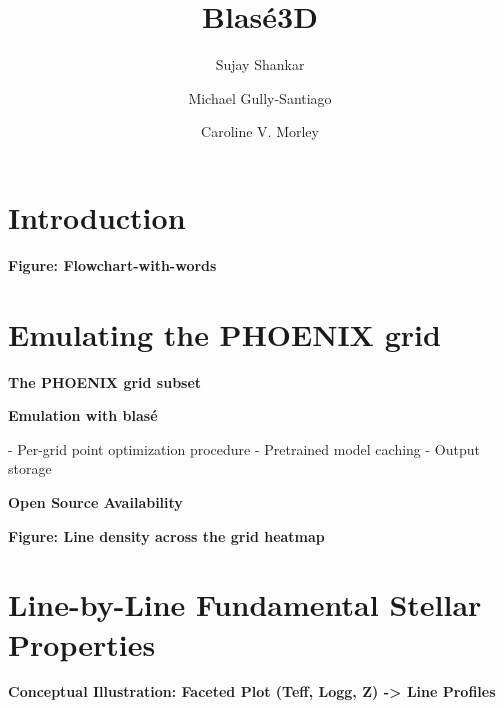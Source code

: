 \documentclass[twocolumn]{aastex631}
\begin{document}
\title{Blas\'e3D}

\author[0000-0002-2290-6810]{Sujay Shankar}
\author[0000-0002-4020-3457]{Michael Gully-Santiago}
\author[0000-0002-4404-0456]{Caroline V. Morley}

\begin{abstract}
    \blindtext
\end{abstract}

\keywords{}


\section{Introduction}
\blindtext

\begin{mdframed}
    \textbf{Figure: Flowchart-with-words}
\end{mdframed}

\section{Emulating the PHOENIX grid}

\begin{mdframed}
    \textbf{The PHOENIX grid subset}

    \textcolor{lightgray}{\blindtext}
\end{mdframed}

\begin{mdframed}
    \textbf{Emulation with blas\'e}

    - Per-grid point optimization procedure
    - Pretrained model caching
    - Output storage

    \textcolor{lightgray}{\blindtext}
\end{mdframed}

\begin{mdframed}
    \textbf{Open Source Availability}

    \textcolor{lightgray}{\blindtext}
\end{mdframed}

\begin{mdframed}
    \textbf{Figure: Line density across the grid heatmap}
\end{mdframed}


\section{Line-by-Line Fundamental Stellar Properties}
\begin{mdframed}
    \textbf{Conceptual Illustration: Faceted Plot (Teff, Logg, Z) -> Line Profiles}
\end{mdframed}
\end{document}

